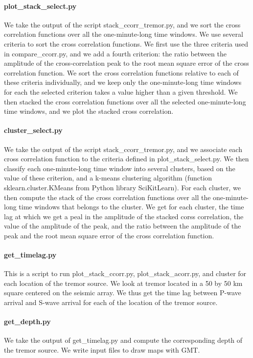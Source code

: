 \documentclass[workdone.tex]{subfiles}
\begin{document}
\paragraph{plot\_stack\_select.py} We take the output of the script stack\_ccorr\_tremor.py, and we sort the cross correlation functions over all the one-minute-long time windows. We use several criteria to sort the cross correlation functions. We first use the three criteria used in compare\_ccorr.py, and we add a fourth criterion: the ratio between the amplitude of the cross-correlation peak to the root mean square error of the cross correlation function. We sort the cross correlation functions relative to each of these criteria individually, and we keep only the one-minute-long time windows for each the selected criterion takes a value higher than a given threshold. We then stacked the cross correlation functions over all the selected one-minute-long time windows, and we plot the stacked cross correlation.

\paragraph{cluster\_select.py} We take the output of the script stack\_ccorr\_tremor.py, and we associate each cross correlation function to the criteria defined in plot\_stack\_select.py. We then classify each one-minute-long time window into several clusters, based on the value of these criterion, and a k-means clustering algorithm (function sklearn.cluster.KMeans from Python library SciKitLearn). For each cluster, we then compute the stack of the cross correlation functions over all the one-minute-long time windows that belongs to the cluster. We get for each cluster, the time lag at which we get a peal in the amplitude of the stacked corss correlation, the value of the amplitude of the peak, and the ratio between the amplitude of the peak and the root mean square error of the cross correlation function.

\paragraph{get\_timelag.py} This is a script to run plot\_stack\_ccorr.py, plot\_stack_acorr.py, and cluster for each location of the tremor source. We look at tremor located in a 50 by 50 km square centered on the seismic array. We thus get the time lag between P-wave arrival and S-wave arrival for each of the location of the tremor source.

\paragraph{get\_depth.py} We take the output of get\_timelag.py and compute the corresponding depth of the tremor source. We write input files to draw maps with GMT.
\end{document}
